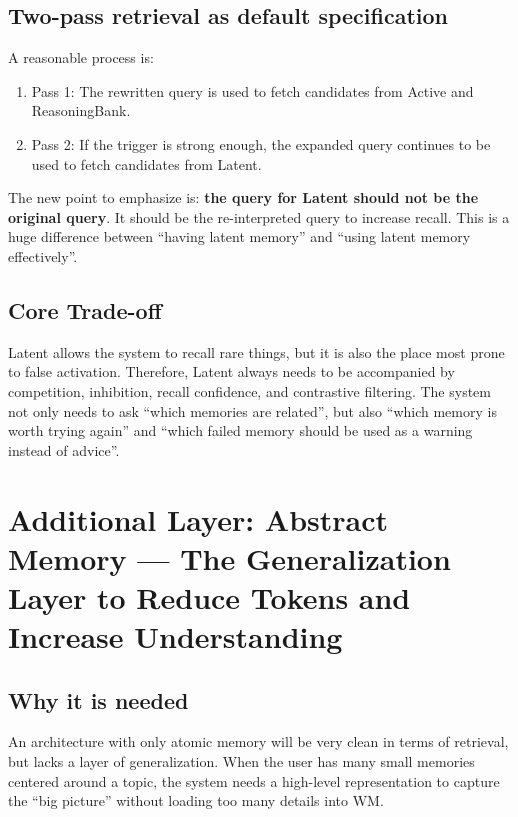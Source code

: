 \documentclass[a4paper,12pt]{article}
\begin{document}
\subsection*{Two-pass retrieval as default specification}

A reasonable process is:
\begin{enumerate}
    \item Pass 1: The rewritten query is used to fetch candidates from Active and ReasoningBank.
    \item Pass 2: If the trigger is strong enough, the expanded query continues to be used to fetch candidates from Latent.
\end{enumerate}

The new point to emphasize is: \textbf{the query for Latent should not be the original query}. It should be the re-interpreted query to increase recall. This is a huge difference between ``having latent memory'' and ``using latent memory effectively''.

\subsection*{Core Trade-off}

Latent allows the system to recall rare things, but it is also the place most prone to false activation. Therefore, Latent always needs to be accompanied by competition, inhibition, recall confidence, and contrastive filtering. The system not only needs to ask ``which memories are related'', but also ``which memory is worth trying again'' and ``which failed memory should be used as a warning instead of advice''.

\section{Additional Layer: Abstract Memory --- The Generalization Layer to Reduce Tokens and Increase Understanding}

\subsection*{Why it is needed}

An architecture with only atomic memory will be very clean in terms of retrieval, but lacks a layer of generalization. When the user has many small memories centered around a topic, the system needs a high-level representation to capture the ``big picture'' without loading too many details into WM.
\end{document}
